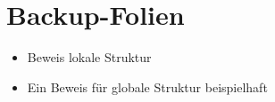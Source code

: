 \documentclass{beamer}
\begin{document}
	\section{Backup-Folien}
	\begin{frame}
		\begin{itemize}
			\item Beweis lokale Struktur
			\item Ein Beweis für globale Struktur beispielhaft
		\end{itemize}
	\end{frame}
\end{document}
